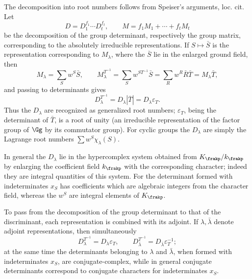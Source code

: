 The decomposition into root numbers follows from Speiser's arguments, loc. cit. Let
\[
        D=D_1^{f_1}\cdots D_t^{f_t},
        \qquad
        M=f_1M_1+\cdots+f_tM_t
\]
be the decomposition of the group determinant, respectively the group matrix, corresponding to the absolutely irreducible representations. If \(S\mapsto\bar S\) is the representation corresponding to \(M_\lambda\), where the \(\bar S\) lie in the enlarged ground field, then
\[
        M_\lambda=\sum_S w^S\bar S,
        \qquad
        M_\lambda^{T^{-1}}=\sum_S w^{ST^{-1}}\bar S
          =\sum_R w^R\bar R\bar T=M_\lambda\bar T,
\]
and passing to determinants gives
\[
        D_\lambda^{T^{-1}}=D_\lambda|\bar T|=D_\lambda\varepsilon_T.
\]
Thus the \(D_\lambda\) are recognized as generalized root numbers; \(\varepsilon_T\), being the determinant of \(\bar T\), is a root of unity (an irreducible representation of the factor group of \(\Gg\) by its commutator group). For cyclic groups the \(D_\lambda\) are simply the Lagrange root numbers \(\sum w^S\chi_\lambda(S)\).

In general the \(D_\lambda\) lie in the hypercomplex system obtained from \(K_\frakp/k_\frakp\) by enlarging the coefficient field \(k_\frakp\) with the corresponding character; indeed they are integral quantities of this system. For the determinant formed with indeterminates \(x_S\) has coefficients which are algebraic integers from the character field, whereas the \(w^S\) are integral elements of \(K_\frakp\).

To pass from the decomposition of the group determinant to that of the discriminant, each representation is combined with its adjoint. If \(\lambda,\bar\lambda\) denote adjoint representations, then simultaneously
\[
        D_\lambda^{T^{-1}}=D_\lambda\varepsilon_T,
        \qquad
        D_{\bar\lambda}^{T^{-1}}=D_{\bar\lambda}\varepsilon_T^{-1};
\]
at the same time the determinants belonging to \(\lambda\) and \(\bar\lambda\), when formed with indeterminates \(x_S\), are conjugate-complex, while in general conjugate determinants correspond to conjugate characters for indeterminates \(x_S\).


